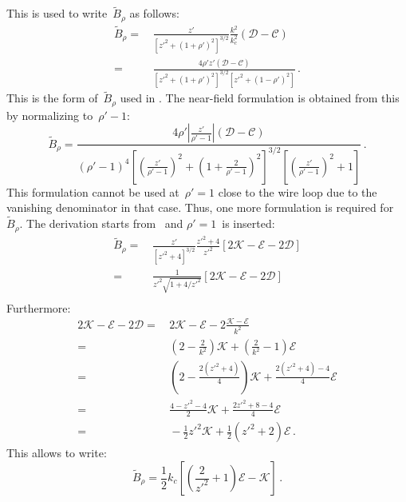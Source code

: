 This is used to write~$\tilde{B}_\rho$ as follows:
\begin{align}
  \tilde{B}_\rho
 =&\, \frac{z'}{\left[ z'^2 + (1 + \rho')^2 \right]^{3/2}} \frac{k^2}{k_c^2} \left(  \mathcal{D} - \mathcal{C} \right) \nonumber \\
 =&\, \frac{4 \rho' z' \left(  \mathcal{D} - \mathcal{C} \right) }{\left[ z'^2 + (1 + \rho')^2 \right]^{3/2} \left[ z'^2 + (1 - \rho')^2 \right]} \, .
\end{align}
This is the form of~$\tilde{B}_\rho$ used in .
The near-field formulation is obtained from this by normalizing to~$\rho'-1$:
\begin{equation}
  \tilde{B}_\rho
 = \frac{4 \rho' \left|\frac{z'}{\rho'-1}\right| \left( \mathcal{D} - \mathcal{C} \right) }
        {(\rho'-1)^4 \left[ \left(\frac{z'}{\rho'-1}\right)^2 + \left(1 + \frac{2}{\rho'-1}\right)^2 \right]^{3/2}
                     \left[ \left(\frac{z'}{\rho'-1}\right)^2 + 1 \right]} \, .
\end{equation}
This formulation cannot be used at~$\rho'=1$ close to the wire loop
due to the vanishing denominator in that case.
Thus, one more formulation is required for~$\tilde{B}_\rho$.
The derivation starts from~ and $\rho'=1$~is inserted:
\begin{align}
  \tilde{B}_\rho
 =&\, \frac{z'}{\left[ z'^2 + 4 \right]^{3/2}} \frac{z'^2 + 4}{z'^2} \left[ 2 \mathcal{K} - \mathcal{E} - 2 \mathcal{D} \right] \nonumber \\
 =&\, \frac{1}{z'^2 \sqrt{1 + 4/z'^2}} \left[ 2 \mathcal{K} - \mathcal{E} - 2 \mathcal{D} \right] \nonumber \\
\end{align}
Furthermore:
\begin{align}
      2 \mathcal{K} - \mathcal{E} - 2 \mathcal{D}
 =&\, 2 \mathcal{K} - \mathcal{E} - 2 \frac{\mathcal{K} - \mathcal{E}}{k^2} \nonumber \\
 =&\, \left( 2 - \frac{2}{k^2} \right) \mathcal{K} + \left( \frac{2}{k^2} - 1 \right) \mathcal{E} \nonumber \\
 =&\, \left( 2 - \frac{2(z'^2+4)}{4} \right) \mathcal{K} + \frac{2(z'^2+4) - 4}{4} \mathcal{E} \nonumber \\
 =&\, \frac{4 - z'^2 -4}{2} \mathcal{K} + \frac{2 z'^2 + 8 - 4}{4} \mathcal{E} \nonumber \\
 =&\, -\frac{1}{2} z'^2 \mathcal{K} + \frac{1}{2}\left(z'^2 +2\right) \mathcal{E} \, .
\end{align}
This allows to write:
\begin{equation}
 \tilde{B}_\rho = \frac{1}{2} k_c \left[ \left( \frac{2}{z'^2} + 1 \right) \mathcal{E} - \mathcal{K} \right] \, .
\end{equation}

